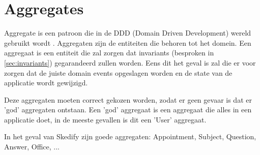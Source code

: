 
\section{Aggregates}
\label{sec:aggregates}

Aggregate is een patroon die in de DDD (Domain Driven Development) wereld gebruikt wordt \textcite{FowlerAggregate}. Aggregaten zijn de entiteiten die behoren tot het domein. Een aggregaat is een entiteit die zal zorgen dat invariants (besproken in \ref{sec:invariants}) gegarandeerd zullen worden. Eens dit het geval is zal die er voor zorgen dat de juiste domain events opgeslagen worden en de state van de applicatie wordt gewijzigd.

Deze aggregaten moeten correct gekozen worden, zodat er geen gevaar is dat er 'god' aggregaten ontstaan. Een 'god' aggregaat is een aggregaat die alles in een applicatie doet, in de meeste gevallen is dit een 'User' aggregaat.

In het geval van Skedify zijn goede aggregaten: Appointment, Subject, Question, Answer, Office, ...